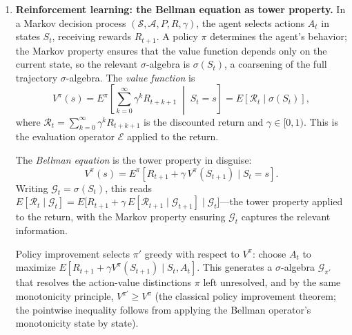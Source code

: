 \begin{example}
\begin{enumerate}[label=(\alph*)]
\item \textbf{Reinforcement learning: the Bellman equation as tower property.} In a Markov decision process $(\mathcal{S}, \mathcal{A}, P, R, \gamma)$, the agent selects actions $A_t$ in states $S_t$, receiving rewards $R_{t+1}$. A policy $\pi$ determines the agent's behavior; the Markov property ensures
that the value function depends only on the current state, so the relevant
$\sigma$-algebra is $\sigma(S_t)$, a coarsening of the full trajectory
$\sigma$-algebra. The \emph{value function} is
\[
V^\pi(s) = E^\pi\!\left[\sum_{k=0}^\infty \gamma^k R_{t+k+1} \;\middle|\; S_t = s\right] = E[\mathcal{R}_t \mid \sigma(S_t)],
\]
where $\mathcal{R}_t = \sum_{k=0}^\infty \gamma^k R_{t+k+1}$ is the discounted return and $\gamma \in [0,1)$. This is the evaluation operator $\mathcal{E}$ applied to the return.

The \emph{Bellman equation} is the tower property in disguise:
\begin{equation}\label{eq:bellman}
V^\pi(s) = E^\pi[R_{t+1} + \gamma\, V^\pi(S_{t+1}) \mid S_t = s].
\end{equation}
Writing $\mathcal{G}_t = \sigma(S_t)$, this reads $E[\mathcal{R}_t \mid \mathcal{G}_t] = E\bigl[R_{t+1} + \gamma\, E[\mathcal{R}_{t+1} \mid \mathcal{G}_{t+1}] \mid \mathcal{G}_t\bigr]$---the tower property applied to the return, with the Markov property ensuring $\mathcal{G}_t$ captures the relevant information.

Policy improvement selects $\pi'$ greedy with respect to $V^\pi$: choose $A_t$ to maximize $E[R_{t+1} + \gamma V^\pi(S_{t+1}) \mid S_t, A_t]$. This generates a $\sigma$-algebra $\mathcal{G}_{\pi'}$ that resolves the action-value distinctions $\pi$ left unresolved, and by the same monotonicity principle, $V^{\pi'} \geq V^\pi$
(the classical policy improvement theorem; the pointwise inequality
follows from applying the Bellman operator's monotonicity state by state).


\end{enumerate}
\end{example}

